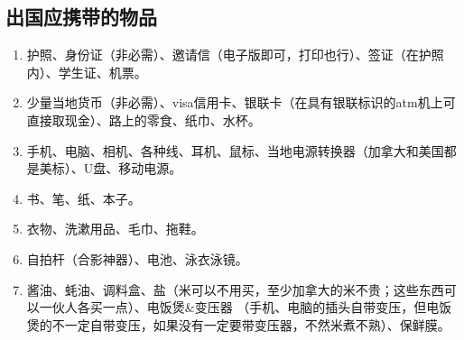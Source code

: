 \subsection{出国应携带的物品}
    \begin{enumerate}
        \item {}护照、身份证（非必需）、邀请信（电子版即可，打印也行）、签证（在护照内）、学生证、机票。
        \item {}少量当地货币（非必需）、visa信用卡、银联卡（在具有银联标识的atm机上可直接取现金）、路上的零食、纸巾、水杯。
        \item {}手机、电脑、相机、各种线、耳机、鼠标、当地电源转换器（加拿大和美国都是美标）、U盘、移动电源。
        \item {}书、笔、纸、本子。
        \item {}衣物、洗漱用品、毛巾、拖鞋。
        \item {}自拍杆（合影神器）、电池、泳衣泳镜。
        \item {}酱油、蚝油、调料盒、盐（米可以不用买，至少加拿大的米不贵；这些东西可以一伙人各买一点）、电饭煲\&变压器
                    （手机、电脑的插头自带变压，但电饭煲的不一定自带变压，如果没有一定要带变压器，不然米煮不熟）、保鲜膜。
    \end{enumerate}